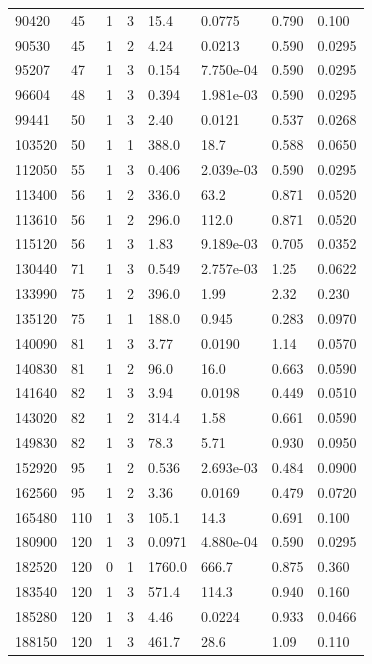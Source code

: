 \documentclass[preview]{standalone}
\begin{document}
{{\begin{tabular}{L{1.2cm}C{1.2cm} C{0.3cm}C{0.5cm} C{1.4cm}C{1.4cm} C{1.4cm}C{1.4cm}}
  90420  &    45  & 1     &  3 &  15.4  & 0.0775  & 0.790 &  0.100   \\ 
  90530  &    45  & 1     &  2 &  4.24  & 0.0213  & 0.590 &  0.0295   \\ 
  95207  &    47  & 1     &  3 &  0.154  & 7.750e-04  & 0.590 &  0.0295   \\ 
  96604  &    48  & 1     &  3 &  0.394  & 1.981e-03  & 0.590 &  0.0295   \\ 
  99441  &    50  & 1     &  3 &  2.40  & 0.0121  & 0.537 &  0.0268   \\ 
  103520  &    50  & 1     &  1 &  388.0  & 18.7  & 0.588 &  0.0650   \\ 
  112050  &    55  & 1     &  3 &  0.406  & 2.039e-03  & 0.590 &  0.0295   \\ 
  113400  &    56  & 1     &  2 &  336.0  & 63.2  & 0.871 &  0.0520   \\ 
  113610  &    56  & 1     &  2 &  296.0  & 112.0  & 0.871 &  0.0520   \\ 
  115120  &    56  & 1     &  3 &  1.83  & 9.189e-03  & 0.705 &  0.0352   \\ 
  130440  &    71  & 1     &  3 &  0.549  & 2.757e-03  & 1.25 &  0.0622   \\ 
  133990  &    75  & 1     &  2 &  396.0  & 1.99  & 2.32 &  0.230   \\ 
  135120  &    75  & 1     &  1 &  188.0  & 0.945  & 0.283 &  0.0970   \\ 
  140090  &    81  & 1     &  3 &  3.77  & 0.0190  & 1.14 &  0.0570   \\ 
  140830  &    81  & 1     &  2 &  96.0  & 16.0  & 0.663 &  0.0590   \\ 
  141640  &    82  & 1     &  3 &  3.94  & 0.0198  & 0.449 &  0.0510   \\ 
  143020  &    82  & 1     &  2 &  314.4  & 1.58  & 0.661 &  0.0590   \\ 
  149830  &    82  & 1     &  3 &  78.3  & 5.71  & 0.930 &  0.0950   \\ 
  152920  &    95  & 1     &  2 &  0.536  & 2.693e-03  & 0.484 &  0.0900   \\ 
  162560  &    95  & 1     &  2 &  3.36  & 0.0169  & 0.479 &  0.0720   \\ 
  165480  &   110  & 1     &  3 &  105.1  & 14.3  & 0.691 &  0.100   \\ 
  180900  &   120  & 1     &  3 &  0.0971  & 4.880e-04  & 0.590 &  0.0295   \\ 
  182520  &   120  & 0     &  1 &  1760.0  & 666.7  & 0.875 &  0.360   \\ 
  183540  &   120  & 1     &  3 &  571.4  & 114.3  & 0.940 &  0.160   \\ 
  185280  &   120  & 1     &  3 &  4.46  & 0.0224  & 0.933 &  0.0466   \\ 
  188150  &   120  & 1     &  3 &  461.7  & 28.6  & 1.09 &  0.110   \\ 
\hline 
\end{tabular} 

}}
\end{document}
